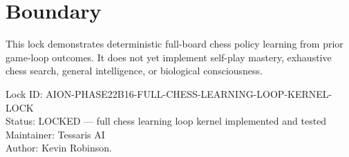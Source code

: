 \documentclass[11pt,a4paper]{article}
\begin{document}
\section{Boundary}

This lock demonstrates deterministic full-board chess policy learning from prior game-loop outcomes. It does not yet implement self-play mastery, exhaustive chess search, general intelligence, or biological consciousness.

\bigskip

\noindent
Lock ID: AION-PHASE22B16-FULL-CHESS-LEARNING-LOOP-KERNEL-LOCK\\
Status: LOCKED --- full chess learning loop kernel implemented and tested\\
Maintainer: Tessaris AI\\
Author: Kevin Robinson.
\end{document}
